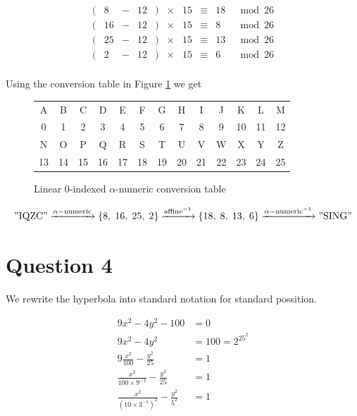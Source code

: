 \documentclass{article}
\begin{document}
$$\begin{matrix}
		( & 8  & - & 12 & ) & \times & 15 & \equiv & 18 & \mod 26 \\
		( & 16 & - & 12 & ) & \times & 15 & \equiv & 8  & \mod 26 \\
		( & 25 & - & 12 & ) & \times & 15 & \equiv & 13 & \mod 26 \\
		( & 2  & - & 12 & ) & \times & 15 & \equiv & 6  & \mod 26 \\
	\end{matrix}$$

Using the conversion table in Figure \ref{fig:conversion-table} we get

\begin{figure}[H]
	\centering
	\begin{tabular}{|c|c|c|c|c|c|c|c|c|c|c|c|c|}
		\hline
		A  & B  & C  & D  & E  & F  & G  & H  & I  & J  & K  & L  & M  \\
		0  & 1  & 2  & 3  & 4  & 5  & 6  & 7  & 8  & 9  & 10 & 11 & 12 \\
		\hline
		N  & O  & P  & Q  & R  & S  & T  & U  & V  & W  & X  & Y  & Z  \\
		13 & 14 & 15 & 16 & 17 & 18 & 19 & 20 & 21 & 22 & 23 & 24 & 25 \\
		\hline
	\end{tabular}
	\caption{Linear $0$-indexed $\alpha$-numeric conversion table}
	\label{fig:conversion-table}
\end{figure}

$$"\mathrm{IQZC}"\xrightarrow{\alpha-\mathrm{numeric}}\{8,\;16,\;25,\;2\}\xrightarrow{\mathrm{affine}^{-1}}\{18,\;8,\;13,\;6\}\xrightarrow{{\alpha-\mathrm{numeric}}^{-1}}"\mathrm{SING}"$$

\section{Question 4}

We rewrite the hyperbola into standard notation for standard possition.

\begin{align*}
	9 x^2 - 4 y^2 - 100                                   & = 0            \\
	9 x^2 - 4 y^2                                         & = 100 = 2^25^2 \\
	9 \frac {x^2} {100} - \frac {y^2} {25}                & = 1            \\
	\frac {x^2} {100\times 9^{-1}} - \frac {y^2} {25}     & = 1            \\
	\frac {x^2} {(10\times 3^{-1})^2} - \frac {y^2} {5^2} & = 1
\end{align*}
\end{document}
